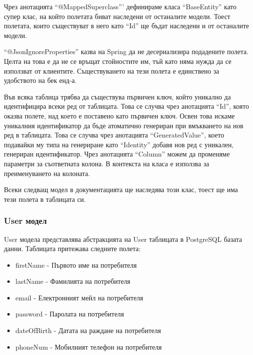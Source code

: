     Чрез анотацията ``@MappedSuperclass''' дефинираме класа ``BaseEntity'' като супер клас, на който полетата биват наследени от останалите модели. Тоест полетата, които съществуват в него като ``Id'' ще бъдат наследени и от останалите модели.
    
    ``@JsonIgnoreProperties'' казва на Spring да не десериализира подадените полета. Целта на това е да не се връщат стойностите им, тъй като няма нужда да се използват от клиентите. Съществуването на тези полета е единствено за удобството на бек енд-а.
    
    Във всяка таблица трябва да съществува първичен ключ, който уникално да идентифицира всеки ред от таблицата. Това се случва чрез анотацията ``Id'', която оказва полете, над което е поставено като първичен ключ. Освен това искаме уникалния идентификатор да бъде атоматично генериран при вмъкването на нов ред в таблицата. Това се случва чрез анотацията ``GeneratedValue'', което подавайки му типа на генериране като ``Identity'' добавя нов ред с уникален, генериран идентификатор. 
    Чрез анотацията ``Column'' можем да променяме параметри за съответната колона. В контекста на класа е използва за преименуването на колоната.
    
    Всеки следващ модел в документацията ще наследява този клас, тоест ще има тези полета в таблицата си.
    
        \subsubsection{User модел}
        User модела представлява абстракцията на User таблицата в PostgreSQL базата данни. 
        Таблицата притежава следните полета:
        \begin{itemize}
            \item firstName - Първото име на потребителя
            \item lastName - Фамилията на потребителя
            \item email - Електронният мейл на потребителя
            \item password - Паролата на потребителя
            \item dateOfBirth - Датата на раждане на потребителя
            \item phoneNum - Мобилният телефон на потребителя
        \end{itemize}
        
